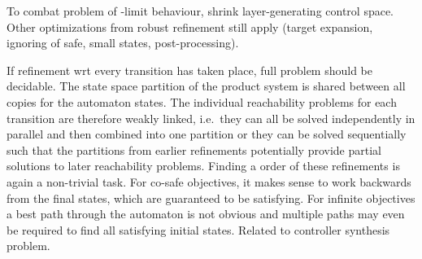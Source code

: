     To combat problem of \epsilon-limit behaviour, shrink layer-generating control space.
    Other optimizations from robust refinement still apply (target expansion, ignoring of safe, small states, post-processing).

\stopsubsection


\startsubsection[title={Transition Selection},reference=refinement-transition-selection]

    If refinement wrt every transition has taken place, full problem should be decidable.
    The state space partition of the product system is shared between all copies for the automaton states.
    The individual reachability problems for each transition are therefore weakly linked, i.e.\ they can all be solved independently in parallel and then combined into one partition or they can be solved sequentially such that the partitions from earlier refinements potentially provide partial solutions to later reachability problems.
    Finding a  order of these refinements is again a non-trivial task.
    For co-safe objectives, it makes sense to work backwards from the final states, which are guaranteed to be satisfying.
    For infinite objectives a best path through the automaton is not obvious and multiple paths may even be required to find all satisfying initial states.
    Related to controller synthesis problem.

\stopsubsection

